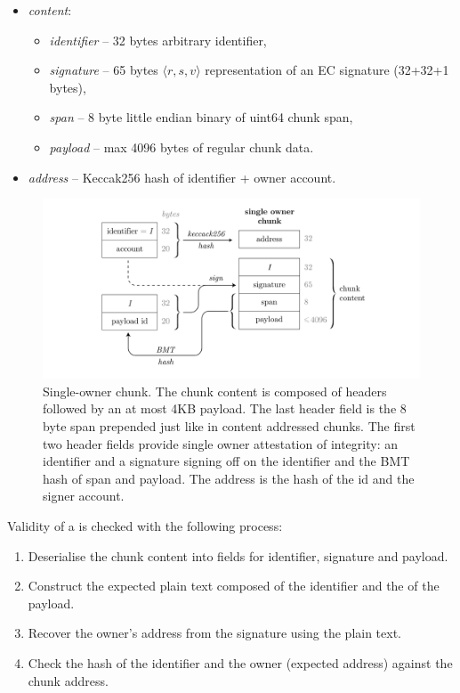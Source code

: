 \begin{itemize}
    \item \emph{content}: 
\begin{itemize}
    \item \emph{identifier} -- 32 bytes arbitrary identifier, 
    \item \emph{signature} -- 65 bytes $\langle r,s,v \rangle$ representation of an EC signature (32+32+1 bytes),
    \item \emph{span} -- 8 byte little endian binary of uint64 chunk span,
    \item \emph{payload} -- max 4096 bytes of regular chunk data.
\end{itemize}
    \item \emph{address} -- Keccak256 hash of identifier + owner account.
\end{itemize}

\begin{figure}[htbp]
   \centering
   \includegraphics[width=\textwidth]{fig/single-owner-chunk.pdf}
   \caption[Single-owner chunk\statusgreen]{Single-owner chunk. The chunk content is composed of headers followed by an at most 4KB payload. The last header field is the 8 byte span prepended just like in content addressed chunks. The first two header fields provide single owner attestation of integrity: an identifier and a signature signing off on the identifier and the BMT hash of span and payload. The address is the hash of the id and the signer account.}
   \label{fig:single-owner-chunks}
\end{figure}

Validity of a  is checked with the following process:

\begin{enumerate}
    \item Deserialise the chunk content into fields for identifier, signature and payload.
    \item Construct the expected plain text composed of the identifier and the  of the payload.
    \item Recover the owner's address from the signature using the plain text.
    \item Check the hash of the identifier and the owner (expected address) against the chunk address.
\end{enumerate}

